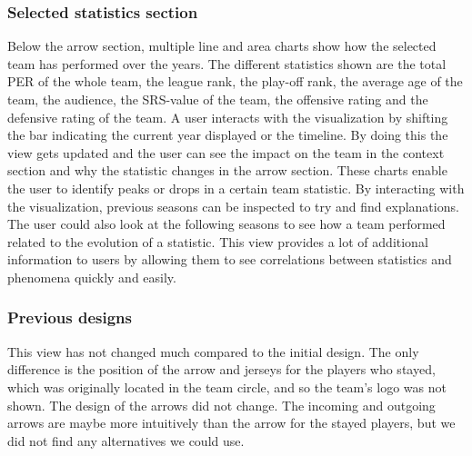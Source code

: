 \documentclass[]{sigchi}
\begin{document}
\subsubsection{Selected statistics section}
Below the arrow section, multiple line and area charts show how the selected 
team has performed over the years. The different statistics shown are the 
total PER of the whole team, the league rank, the play-off rank, the average age 
of the team, the audience, the SRS-value of the team, the offensive rating and 
the defensive rating of the team. A user interacts with the visualization by 
shifting the bar indicating the current year displayed or the timeline. By 
doing this the view gets updated and the user can see the impact on the team 
in the context section and why the statistic changes in the arrow section. 
These charts enable the user to identify peaks or drops in a certain team statistic. 
By interacting with the visualization, previous seasons can be inspected to try 
and find explanations. The user could also look at the following seasons to see how a team 
performed related to the evolution of a statistic. This view provides 
a lot of additional information to users by allowing them to see correlations 
between statistics and phenomena quickly and easily.

\subsubsection{Previous designs}
This view has not changed much compared to the initial design. The only difference 
is the position of the arrow and jerseys for the players who stayed, which was originally located in the team circle, and so the team's logo was not shown. 
The design of the arrows did not change. The incoming and outgoing 
arrows are maybe more intuitively than the arrow for the stayed players, but we did 
not find any alternatives we could use.
\end{document}
